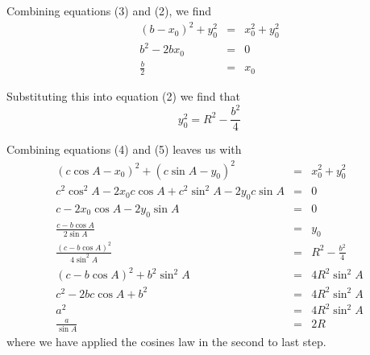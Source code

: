 \documentclass[12pt]{article}
\begin{document}
Combining equations (3) and (2), we find
\begin{eqnarray*}
\left(b-x_0\right)^2 + y_0^2 &=& x_0^2 + y_0^2\\
b^2 - 2bx_0 &=& 0\\
\frac{b}{2} &=& x_0
\end{eqnarray*}

Substituting this into equation (2) we find that 
\begin{equation}
y_0^2 = R^2 - \frac{b^2}{4}\label{y_0}
\end{equation}

Combining equations (4) and (5) leaves us with
\begin{eqnarray*}
\left(c\cos A-x_0\right)^2 + \left(c \sin A - y_0\right)^2 &=& x_0^2 +
y_0^2\\
c^2\cos^2A-2x_0c\cos A + c^2\sin^2A-2y_0c\sin A &=& 0\\
c-2x_0\cos A - 2y_0 \sin A &=&0\\
\frac{c-b\cos A}{2\sin A} &=& y_0\\
\frac{\left(c-b\cos A\right)^2}{4\sin^2A} &=& R^2 - \frac{b^2}{4}\\
\left(c-b\cos A\right)^2 + b^2 \sin^2 A &=& 4R^2\sin^2 A\\
c^2 - 2bc\cos A +b^2 &=& 4R^2\sin^2A\\
a^2 &=& 4R^2\sin^2A\\
\frac{a}{\sin A} &=& 2R
\end{eqnarray*}
where we have applied the cosines law in the second to last step.
\end{document}
